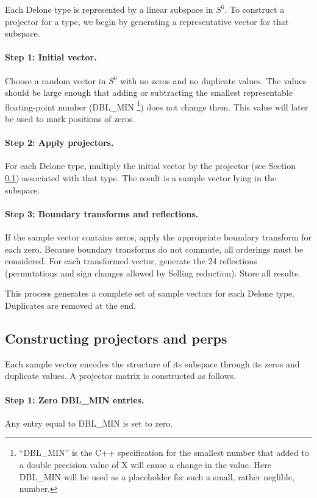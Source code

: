 \documentclass[preprint]{iucr}              %
\begin{document}
	Each Delone type is represented by a linear subspace in $S^6$. To construct a
	projector for a type, we begin by generating a representative vector for that
	subspace.
	
	\paragraph{Step 1: Initial vector.}
	Choose a random vector in $S^6$ with no zeros and no duplicate values. The
	values should be large enough that adding or subtracting the smallest
	representable floating-point number (DBL\_MIN \footnote{``DBL\_MIN'' is the C++
		specification for the smallest number that added to a double precision
		value of X will cause a change in the value. Here DBL\_MIN will
		be used as a placeholder for such a small, rather neglible,
		number.}) does not change them. This
	value will later be used to mark positions of zeros.
	
	\paragraph{Step 2: Apply projectors.}
	For each Delone type, multiply the initial vector by the projector (see Section \ref{constructProjectors}) associated
	with that type. The result is a sample vector lying in the subspace.
	
	\paragraph{Step 3: Boundary transforms and reflections.}
	If the sample vector contains zeros, apply the appropriate boundary transform
	for each zero. Because boundary transforms do not commute, all orderings must
	be considered. For each transformed vector, generate the 24 reflections
	(permutations and sign changes allowed by Selling reduction). Store all
	results.
	
	This process generates a complete set of sample vectors for each Delone type.
	Duplicates are removed at the end.
	
	\subsection{Constructing projectors and perps}
	\label{constructProjectors}
	Each sample vector encodes the structure of its subspace through its zeros and
	duplicate values. A projector matrix is constructed as follows.
	
	\paragraph{Step 1: Zero DBL\_MIN entries.}
	Any entry equal to DBL\_MIN is set to zero.
	
\end{document}
